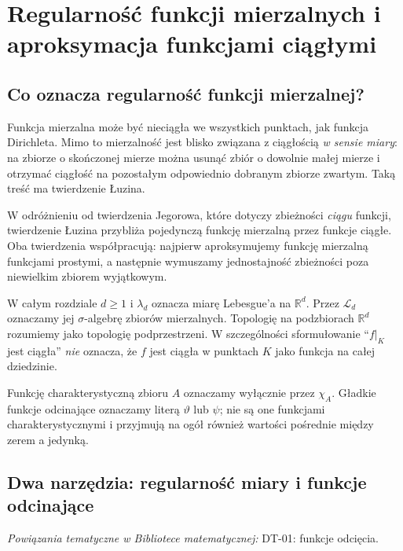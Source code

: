 \chapter[Regularność funkcji mierzalnych]{Regularność funkcji mierzalnych i aproksymacja funkcjami ciągłymi}
\label{ch:regularnosc-funkcji}

\providecommand{\atlasref}[2]{#2}


\section{Co oznacza regularność funkcji mierzalnej?}

Funkcja mierzalna może być nieciągła we wszystkich punktach,
jak funkcja Dirichleta. Mimo to mierzalność jest blisko
związana z ciągłością \emph{w sensie miary}: na zbiorze o
skończonej mierze można usunąć zbiór o dowolnie małej mierze
i otrzymać ciągłość na pozostałym odpowiednio dobranym
zbiorze zwartym. Taką treść ma twierdzenie Łuzina.

W odróżnieniu od twierdzenia Jegorowa, które dotyczy
zbieżności \emph{ciągu} funkcji, twierdzenie Łuzina
przybliża pojedynczą funkcję mierzalną przez funkcje
ciągłe. Oba twierdzenia współpracują: najpierw
aproksymujemy funkcję mierzalną funkcjami prostymi,
a następnie wymuszamy jednostajność zbieżności
poza niewielkim zbiorem wyjątkowym.

W całym rozdziale $d\ge1$ i $\lambda_d$ oznacza miarę
Lebesgue'a na $\mathbb R^d$. Przez $\mathcal L_d$
oznaczamy jej $\sigma$-algebrę zbiorów mierzalnych.
Topologię na podzbiorach $\mathbb R^d$ rozumiemy jako
topologię podprzestrzeni. W szczególności sformułowanie
``$f|_K$ jest ciągła'' \emph{nie} oznacza,
że $f$ jest ciągła w punktach $K$ jako funkcja na
całej dziedzinie.

\begin{uwaga}
Funkcję charakterystyczną zbioru $A$ oznaczamy
wyłącznie przez $\chi_A$. Gładkie funkcje odcinające
oznaczamy literą $\vartheta$ lub $\psi$; nie są one
funkcjami charakterystycznymi i przyjmują na ogół
również wartości pośrednie między zerem a jedynką.
\end{uwaga}

\section{Dwa narzędzia: regularność miary i funkcje odcinające}

\noindent\emph{Powiązania tematyczne w Bibliotece matematycznej:} \atlasref{DT-01::lem:cutoffs17}{DT-01: funkcje odcięcia}.


